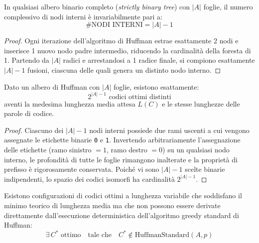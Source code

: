 \begin{property}
\label{prop:nodi-interni}
In qualsiasi albero binario completo (\textit{strictly binary tree}) con $\vert A \vert$ foglie, il numero complessivo di nodi interni \`e invariabilmente pari a:
\begin{equation}
  \#\text{NODI INTERNI} = \vert A \vert - 1
\end{equation}
\end{property}
\begin{proof}
Ogni iterazione dell'algoritmo di Huffman estrae esattamente 2 nodi e inserisce 1 nuovo nodo padre intermedio, riducendo la cardinalit\`a della foresta di 1. Partendo da $\vert A \vert$ radici e arrestandosi a 1 radice finale, si compiono esattamente $\vert A \vert - 1$ fusioni, ciascuna delle quali genera un distinto nodo interno.
\end{proof}

\begin{property}
\label{prop:molteplicita-codici}
Dato un albero di Huffman con $\vert A \vert$ foglie, esistono esattamente:
\begin{equation}
  2^{\vert A \vert - 1} \text{ codici ottimi distinti}
\end{equation}
aventi la medesima lunghezza media attesa $L(C)$ e le stesse lunghezze delle parole di codice.
\end{property}
\begin{proof}
Ciascuno dei $\vert A \vert - 1$ nodi interni possiede due rami uscenti a cui vengono assegnate le etichette binarie \texttt{0} e \texttt{1}. Invertendo arbitrariamente l'assegnazione delle etichette (ramo sinistro $= 1$, ramo destro $= 0$) su un qualsiasi nodo interno, le profondit\`a di tutte le foglie rimangono inalterate e la propriet\`a di prefisso \`e rigorosamente conservata. Poich\'e vi sono $\vert A \vert - 1$ scelte binarie indipendenti, lo spazio dei codici isomorfi ha cardinalit\`a $2^{\vert A \vert - 1}$.
\end{proof}

\begin{property}
\label{prop:non-esaustivita}
Esistono configurazioni di codici ottimi a lunghezza variabile che soddisfano il minimo teorico di lunghezza media ma che non possono essere derivate direttamente dall'esecuzione deterministica dell'algoritmo greedy standard di Huffman:
\begin{equation}
  \exists \, C^* \text{ ottimo} \quad \text{tale che} \quad C^* \notin \text{HuffmanStandard}(A, p)
\end{equation}
\end{property}

